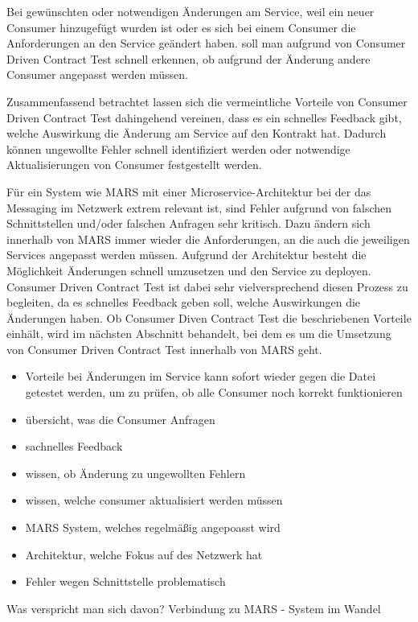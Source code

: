 \documentclass{llncs}
\begin{document}
Bei gewünschten oder notwendigen Änderungen am Service, weil ein neuer Consumer hinzugefügt wurden ist oder es sich bei einem Consumer die Anforderungen an den Service geändert haben. soll man aufgrund von Consumer Driven Contract Test schnell erkennen, ob aufgrund der Änderung andere Consumer angepasst werden müssen. 

Zusammenfassend betrachtet lassen sich die vermeintliche Vorteile von Consumer Driven Contract Test dahingehend vereinen, dass es ein schnelles Feedback gibt, welche Auswirkung die Änderung am Service auf den Kontrakt hat. Dadurch können ungewollte Fehler schnell identifiziert werden oder notwendige Aktualisierungen von Consumer festgestellt werden.

Für ein System wie MARS mit einer Microservice-Architektur bei der das Messaging im Netzwerk extrem relevant ist, sind Fehler aufgrund von falschen Schnittstellen und/oder falschen Anfragen sehr kritisch. Dazu ändern sich innerhalb von MARS immer wieder die Anforderungen, an die auch die jeweiligen Services angepasst werden müssen. Aufgrund der Architektur besteht die Möglichkeit Änderungen schnell umzusetzen und den Service zu deployen. Consumer Driven Contract Test ist dabei sehr vielversprechend diesen Prozess zu begleiten, da es schnelles Feedback geben soll, welche Auswirkungen die Änderungen haben. Ob Consumer Diven Contract Test die beschriebenen Vorteile einhält, wird im nächsten Abschnitt behandelt, bei dem es um die Umsetzung von Consumer Driven Contract Test innerhalb von MARS geht.

\begin{itemize}
\item Vorteile bei Änderungen im Service kann sofort wieder gegen die Datei getestet werden, um zu prüfen, ob alle Consumer noch korrekt funktionieren
\item übersicht, was die Consumer Anfragen
\item sachnelles Feedback
\item wissen, ob Änderung zu ungewollten Fehlern
\item wissen, welche consumer aktualisiert werden müssen
\item MARS System, welches regelmäßig angepoasst wird
\item Architektur, welche Fokus auf des Netzwerk hat
\item Fehler wegen Schnittstelle problematisch
\end{itemize}
Was verspricht man sich davon?
Verbindung zu MARS - System im Wandel
\end{document}
